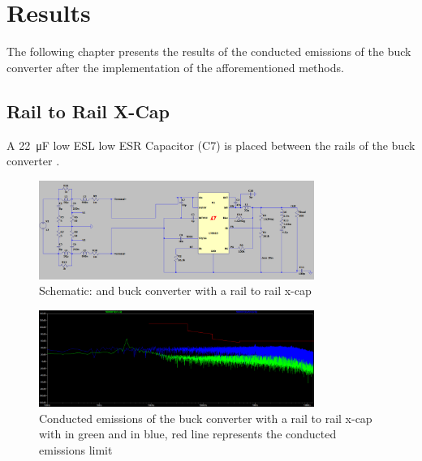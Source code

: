 \chapter{Results}
\label{chapter:results}
The following chapter presents the results of the conducted emissions of the buck converter after the implementation of the afforementioned methods.

\section{Rail to Rail X-Cap}
\label{section:x_cap} 
A \qty{22}{\micro\farad} low ESL low ESR Capacitor (C7) is placed between the rails of the buck converter \autocite{885012209006WurthElektronik}.

\begin{figure}[htbp]
    \centering
    \includegraphics[width=0.8\textwidth]{img/schematic_no_cmc_22u_x_cap.png}
    \caption{Schematic:  and buck converter with a rail to rail x-cap}
    \label{fig:x_cap_schematic}
\end{figure}

\begin{figure}[htbp]
    \centering
    \includegraphics[width=0.8\textwidth]{img/emi_no_cmc_22u_x_cap.png}
    \caption{Conducted emissions of the buck converter with a rail to rail x-cap with  in green and  in blue, red line represents the conducted emissions limit}
    \label{fig:x_cap_emc}
\end{figure}

